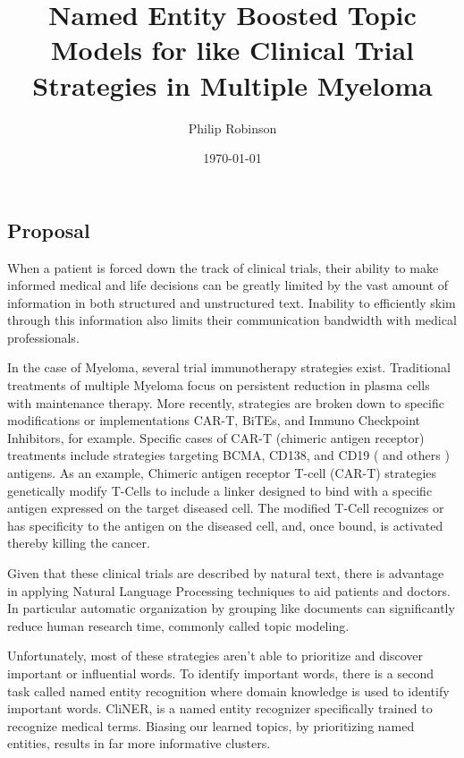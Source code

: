 \documentclass{article}
\title{Named Entity Boosted Topic Models for like Clinical Trial Strategies in Multiple Myeloma}
\date{\today}
\author{Philip Robinson}
\affil{OHSU: Center for Speach and Learning Understanding}
\begin{document}
\maketitle



\begin{multicols}{2}

\section{Proposal}
When a patient is forced down the track of clinical trials, their ability to make informed medical and life decisions can be greatly limited by the vast amount of information in both structured and unstructured text. Inability to efficiently skim through this information also limits their communication bandwidth with medical professionals.

In the case of Myeloma, several trial immunotherapy strategies exist. Traditional treatments of multiple Myeloma focus on persistent reduction in plasma cells with maintenance therapy. More recently, strategies are broken down to specific modifications or implementations CAR-T, BiTEs, and Immuno Checkpoint Inhibitors, for example. Specific cases of CAR-T (chimeric antigen receptor) treatments include strategies targeting BCMA, CD138, and CD19 ( and others ) antigens. As an example, Chimeric antigen receptor T-cell (CAR-T) strategies genetically modify T-Cells to include a linker designed to bind with a specific antigen expressed on the target diseased cell. The modified T-Cell recognizes or has specificity to the antigen on the diseased cell, and, once bound, is activated thereby killing the cancer.

Given that these clinical trials are described by natural text, there is advantage in applying Natural Language Processing techniques to aid patients and doctors. In particular automatic organization by grouping like documents can significantly reduce human research time, commonly called topic modeling\cite{Alghamdi2015}.

Unfortunately, most of these strategies aren't able to prioritize and discover important or influential words. To identify important words, there is a second task called named entity recognition where domain knowledge is used to identify important words. CliNER\cite{2018arXiv180302245B}, is a named entity recognizer specifically trained to recognize medical terms. Biasing our learned topics, by prioritizing named entities, results in far more informative clusters\cite{Krasnashchok2018ImprovingTQ,Kim:2012:EET:2471881.2472545}.


\end{multicols}
\end{document}
